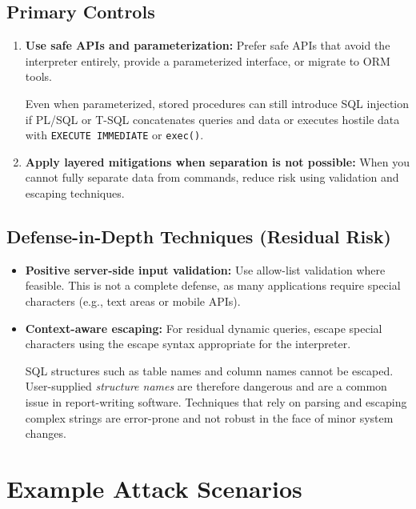 \documentclass[11pt]{article}
\begin{document}
\subsection{Primary Controls}
\begin{enumerate}
  \item \textbf{Use safe APIs and parameterization:} Prefer safe APIs that avoid the interpreter entirely, provide a parameterized interface, or migrate to ORM tools.
  \begin{infobox}
  Even when parameterized, stored procedures can still introduce SQL injection if PL/SQL or T-SQL concatenates queries and data or executes hostile data with \texttt{EXECUTE IMMEDIATE} or \texttt{exec()}.
  \end{infobox}
  \item \textbf{Apply layered mitigations when separation is not possible:} When you cannot fully separate data from commands, reduce risk using validation and escaping techniques.
\end{enumerate}

\subsection{Defense-in-Depth Techniques (Residual Risk)}
\begin{itemize}
  \item \textbf{Positive server-side input validation:} Use allow-list validation where feasible. This is not a complete defense, as many applications require special characters (e.g., text areas or mobile APIs).
  \item \textbf{Context-aware escaping:} For residual dynamic queries, escape special characters using the escape syntax appropriate for the interpreter.
  \begin{infobox}
  SQL structures such as table names and column names cannot be escaped. User-supplied \emph{structure names} are therefore dangerous and are a common issue in report-writing software. Techniques that rely on parsing and escaping complex strings are error-prone and not robust in the face of minor system changes.
  \end{infobox}
\end{itemize}

\section{Example Attack Scenarios}
\end{document}
